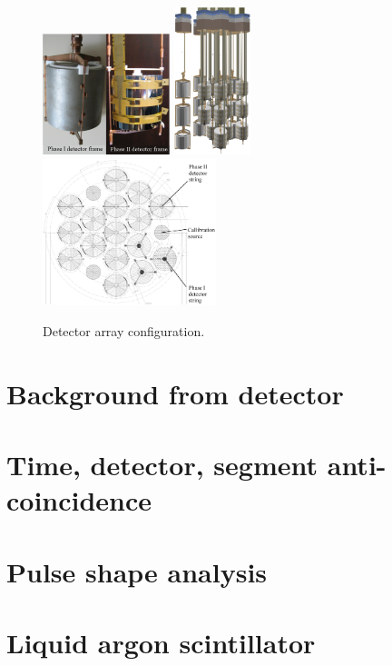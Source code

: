 \begin{figure}[tbhp]
  \centering
  \includegraphics[width=0.33\textwidth]{detectorFrame}
  \includegraphics[width=0.2\textwidth]{array}
  \includegraphics[width=0.45\textwidth]{arrayTop}
  \caption{Detector array configuration.}
  \label{fig:array}
\end{figure}


\section{Background from detector}
\label{sec:gerda:source}

\section{Time, detector, segment anti-coincidence}
\label{sec:gerda:anti}
\section{Pulse shape analysis}
\label{sec:gerda:psa}

\section{Liquid argon scintillator}
\label{sec:gerda:scin}

